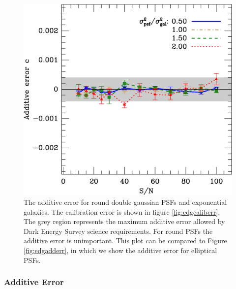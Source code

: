 \documentclass[10pt,preprint]{aastex}
\newcommand{\psf}{PSF}
\begin{document}
\begin{figure}[t] \centering
 \centering 
 \includegraphics[scale=0.65]{figures/set-s2n-edg04-c-vs-shear.eps}

 \caption{The additive error for round double gaussian \psf s and exponential
 galaxies.  The calibration error is shown in figure \ref{fig:edgcaliberr}.
 The grey region represents the maximum additive error allowed by Dark Energy
 Survey science requirements.  For round \psf s the additive error is
 unimportant.  This plot can be compared to Figure \ref{fig:edgadderr},
 in which we show the additive error for elliptical \psf s.  } 

 \label{fig:edgverifyadditive}
\end{figure}


\subsubsection{Additive Error}
\end{document}
